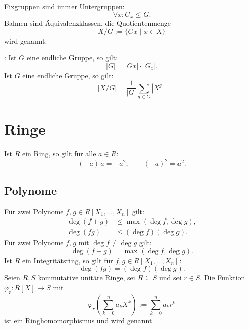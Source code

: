 Fixgruppen sind immer Untergruppen:
\begin{equation}
\forall x\colon G_x\le G.
\end{equation}
Bahnen sind Äquivalenzklassen, die Quotientenmenge
\begin{equation}
X/G := \{Gx\mid x\in X\}
\end{equation}
wird  genannt.

\noindent
{}:
Ist $G$ eine endliche Gruppe, so gilt:
\begin{equation}
|G| = |Gx|\cdot |G_x|.
\end{equation}
Ist $G$ eine endliche Gruppe, so gilt:
\begin{equation}
|X/G| = \frac{1}{|G|}\sum_{g\in G}|X^g|.
\end{equation}

\section{Ringe}
Ist $R$ ein Ring, so gilt für alle $a\in R$:
\begin{equation}
(-a)\,a = -a^2,\qquad (-a)^2=a^2.
\end{equation}

\subsection{Polynome}
Für zwei Polynome $f,g\in R[X_1,\ldots,X_n]$ gilt:
\begin{align}
\deg(f+g)&\le \max(\deg f,\deg g),\\
\deg(fg)&\le (\deg f)(\deg g).
\end{align}
Für zwei Polynome $f,g$ mit $\deg f\ne\deg g$ gilt:
\begin{equation}
\deg(f+g) = \max(\deg f,\deg g).
\end{equation}
Ist $R$ ein Integritätsring, so gilt für $f,g\in R[X_1,\ldots,X_n]$:%
\begin{equation}
\deg(fg) = (\deg f)(\deg g).
\end{equation}
Seien $R,S$ kommutative unitäre Ringe, sei $R\subseteq S$
und sei $r\in S$.
Die Funktion $\varphi_r\colon R[X]\to S$ mit
\begin{equation}\textstyle
\varphi_r(\sum_{k=0}^n a_k X^k):=\sum_{k=0}^n a_k r^k 
\end{equation}
ist ein Ringhomomorphismus und wird
genannt.
\begin{equation}
\end{equation}


